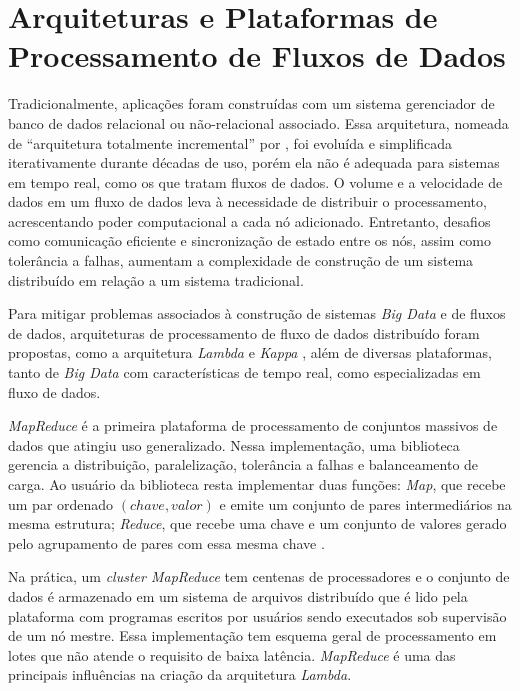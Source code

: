 \section{Arquiteturas e Plataformas de Processamento de Fluxos de Dados}
\label{sec:frameworks}

Tradicionalmente, aplicações
foram construídas com um sistema gerenciador de
banco de dados relacional ou não-relacional associado.
Essa arquitetura,
nomeada de ``arquitetura totalmente incremental'' por ,
foi evoluída e simplificada iterativamente durante décadas de uso, porém ela não
é adequada para sistemas em tempo real, como os que tratam fluxos de dados.
O volume e a velocidade de dados em um fluxo de dados leva à necessidade de
distribuir o processamento, acrescentando poder computacional a cada nó
adicionado.
Entretanto, desafios como comunicação eficiente e sincronização de estado
entre os nós, assim como tolerância a falhas, aumentam a complexidade de
construção de um sistema distribuído em relação a um sistema tradicional.

\newcommand{\lambdaa}{\xspace\emph{Lambda}\xspace}
\newcommand{\kappaa}{\xspace\emph{Kappa}\xspace}

Para mitigar problemas associados à construção de sistemas \emph{Big Data} e de
fluxos de dados, arquiteturas de processamento de fluxo de dados distribuído
foram propostas, como a arquitetura \lambdaa \cite{marz2015big} e \kappaa
\cite{Kreps2014}, além de diversas plataformas, tanto de \emph{Big Data} com
características de tempo real, como especializadas em fluxo de dados.

\emph{MapReduce} é a primeira plataforma de processamento de conjuntos massivos
de dados que atingiu uso generalizado.
Nessa implementação, uma biblioteca gerencia a distribuição, paralelização,
tolerância a falhas e balanceamento de carga.
Ao usuário da biblioteca resta implementar duas funções:
\emph{Map}, que recebe um par ordenado
$(chave, valor)$ e emite um conjunto de pares intermediários na mesma estrutura;
\emph{Reduce}, que recebe uma chave e um conjunto de valores gerado pelo agrupamento
de pares com essa mesma chave \cite{Dean2004}.

Na prática, um \emph{cluster MapReduce} tem centenas de processadores e o
conjunto de dados é armazenado em um sistema de arquivos distribuído que é lido
pela plataforma com programas escritos por usuários sendo executados sob
supervisão de um nó mestre.
Essa implementação tem esquema geral de processamento em lotes que não atende o
requisito de baixa latência.
\nobreakdash \emph{MapReduce} é uma das principais influências na criação da arquitetura \lambdaa \cite{marz2015big}.

